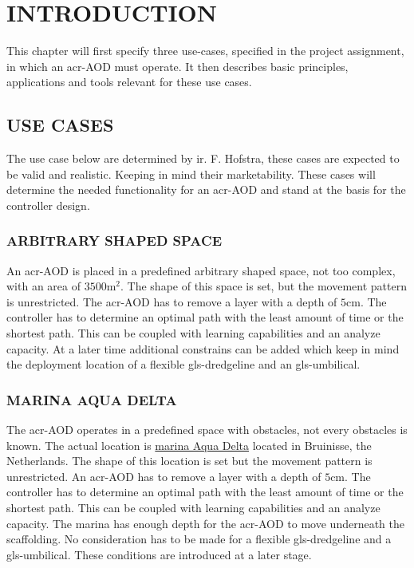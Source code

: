 \chapter{INTRODUCTION}\label{chap:Introduction}


 This chapter will first specify three use-cases, specified in the project assignment, in which an \gls{acr-AOD} must operate. It then describes basic principles, applications and tools relevant for these use cases.

\section{USE CASES}\label{sec:usecases}
The use case below are determined by ir. F. Hofstra, these cases are expected to be valid and realistic. Keeping in mind their marketability. These cases will determine the needed functionality for an \gls{acr-AOD} and stand at the basis for the controller design.

\subsection{ARBITRARY SHAPED SPACE}\label{sec:usecase1}
An \gls{acr-AOD} is placed in a predefined arbitrary shaped space, not too complex, with an area of \( 3500 \si{\square\metre} \). The shape of this space is set, but the movement pattern is unrestricted. The \gls{acr-AOD} has to remove a layer with a depth of \( 5 \si{\cm} \). The controller has to determine an optimal path with the least amount of time or the shortest path. This can be coupled with learning capabilities and an analyze capacity. At a later time additional constrains can be added which keep in mind the deployment location of a flexible \gls{gls-dredgeline} and an \gls{gls-umbilical}.

\subsection{MARINA AQUA DELTA}\label{sec:usecase2}
The \gls{acr-AOD} operates in a predefined space with obstacles, not every obstacles is known. The actual location is \href{https://www.google.nl/maps/place/Jachthaven+Bruinisse/@51.6712838,4.0824101,15z/data=!4m2!3m1!1s0x0:0x9c840ab80bde39c8}{marina Aqua Delta} located in Bruinisse, the Netherlands. The shape of this location is set but the movement pattern is unrestricted. An \gls{acr-AOD}  has to remove a layer with a depth of \( 5 \si{\cm} \). The controller has to determine an optimal path with the least amount of time or the shortest path. This can be coupled with learning capabilities and an analyze capacity. The marina has enough depth for the \gls{acr-AOD} to move underneath the scaffolding.
No consideration has to be made for a flexible \gls{gls-dredgeline} and a \gls{gls-umbilical}. These conditions are introduced at a later stage.

